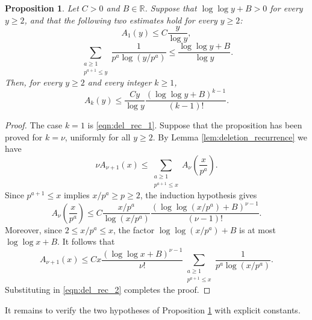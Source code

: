 \documentclass[12pt,a4paper,reqno]{amsart}
\theoremstyle{plain}
\newtheorem{prpstn}[thrm]{Proposition}
\numberwithin{sblmm}{thrm}
\numberwithin{equation}{section}
\begin{document}
\begin{prpstn}\label{prop:deletion_machine}
    Let $C>0$ and $B\in\mathbb{R}$. Suppose that $\log\log y+B>0$ for every $y\ge 2$, and that the following two estimates hold for every $y\ge 2$:
    \begin{equation}\label{eqn:del_rec_1}
        A_1(y)\le C\frac{y}{\log y},
    \end{equation}
    \begin{equation}\label{eqn:del_rec_2}
        \sum_{\substack{a\ge 1\\ p^{a+1}\le y}}\frac{1}{p^a\log(y/p^a)}\le\frac{\log\log y+B}{\log y}.
    \end{equation}
    Then, for every $y\ge 2$ and every integer $k\ge 1$,
    $$A_k(y)\le\frac{Cy}{\log y}\frac{(\log\log y+B)^{k-1}}{(k-1)!}.$$
\end{prpstn}
\begin{proof}
    The case $k=1$ is \eqref{eqn:del_rec_1}. Suppose that the proposition has been proved for $k=\nu$, uniformly for all $y\ge 2$. By Lemma \ref{lem:deletion_recurrence} we have
    $$\nu A_{\nu+1}(x)\le\sum_{\substack{a\ge 1\\ p^{a+1}\le x}}A_{\nu}\left(\frac{x}{p^a}\right).$$
    Since $p^{a+1}\le x$ implies $x/p^a\ge p\ge 2$, the induction hypothesis gives
    $$A_{\nu}\left(\frac{x}{p^a}\right)\le C\frac{x/p^a}{\log(x/p^a)}\frac{(\log\log(x/p^a)+B)^{\nu-1}}{(\nu-1)!}.$$
    Moreover, since $2\le x/p^a\le x$, the factor $\log\log(x/p^a)+B$ is at most $\log\log x+B$. It follows that
    $$A_{\nu+1}(x)\le Cx\frac{(\log\log x+B)^{\nu-1}}{\nu!}\sum_{\substack{a\ge 1\\ p^{a+1}\le x}}\frac{1}{p^a\log(x/p^a)}.$$
    Substituting in \eqref{eqn:del_rec_2} completes the proof.
\end{proof}
It remains to verify the two hypotheses of Proposition \ref{prop:deletion_machine} with explicit constants.
\end{document}
